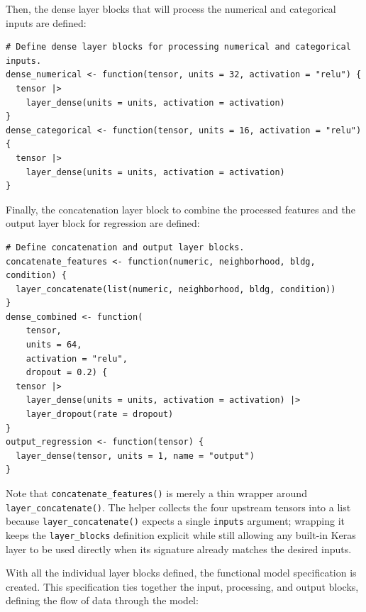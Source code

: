 Then, the dense layer blocks that will process the numerical and categorical inputs are defined:

\begin{verbatim}
# Define dense layer blocks for processing numerical and categorical inputs.
dense_numerical <- function(tensor, units = 32, activation = "relu") {
  tensor |>
    layer_dense(units = units, activation = activation)
}
dense_categorical <- function(tensor, units = 16, activation = "relu") {
  tensor |>
    layer_dense(units = units, activation = activation)
}
\end{verbatim}

Finally, the concatenation layer block to combine the processed features and the output layer block for regression are defined:

\begin{verbatim}
# Define concatenation and output layer blocks.
concatenate_features <- function(numeric, neighborhood, bldg, condition) {
  layer_concatenate(list(numeric, neighborhood, bldg, condition))
}
dense_combined <- function(
    tensor,
    units = 64,
    activation = "relu",
    dropout = 0.2) {
  tensor |>
    layer_dense(units = units, activation = activation) |>
    layer_dropout(rate = dropout)
}
output_regression <- function(tensor) {
  layer_dense(tensor, units = 1, name = "output")
}
\end{verbatim}

Note that \texttt{concatenate\_features()} is merely a thin wrapper around \texttt{layer\_concatenate()}. The helper collects the four upstream tensors into a list because \texttt{layer\_concatenate()} expects a single \texttt{inputs} argument; wrapping it keeps the \texttt{layer\_blocks} definition explicit while still allowing any built-in Keras layer to be used directly when its signature already matches the desired inputs.

With all the individual layer blocks defined, the  functional model specification is created. This specification ties together the input, processing, and output blocks, defining the flow of data through the model:


